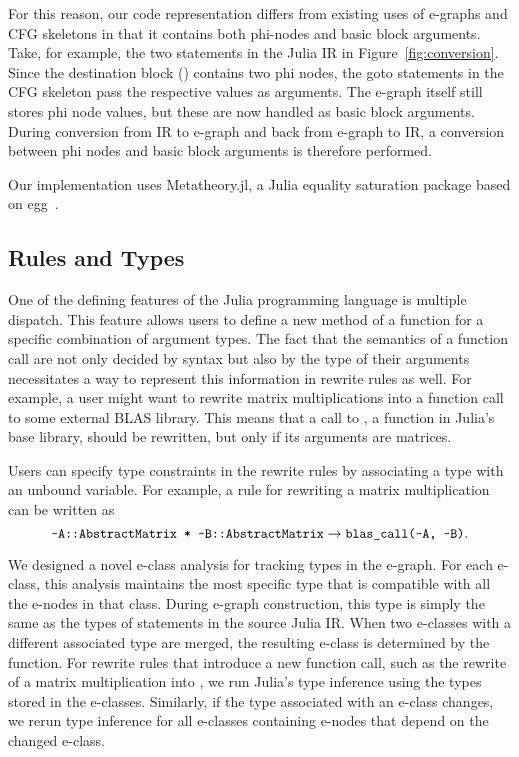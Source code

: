 For this reason, our code representation differs from existing uses of e-graphs and CFG skeletons in that it contains both phi-nodes and basic block arguments. 
Take, for example, the two  statements in the Julia IR in Figure~\ref{fig:conversion}.
Since the destination block () contains two phi nodes, the goto statements in the CFG skeleton pass the respective values as arguments.
The e-graph itself still stores phi node values, but these are now handled as basic block arguments.
During conversion from IR to e-graph and back from e-graph to IR, a conversion between phi nodes and basic block arguments is therefore performed. 

Our implementation uses Metatheory.jl, a Julia equality saturation package based on egg~\cite{cheliMetatheoryjlFastElegant2021,willseyEggFastExtensible2021}.

\subsection{Rules and Types}
\label{sec:types}
One of the defining features of the Julia programming language is multiple dispatch.
This feature allows users to define a new method of a function for a specific combination of argument types.
The fact that the semantics of a function call are not only decided by syntax but also by the type of their arguments necessitates a way to represent this information in rewrite rules as well.
For example, a user might want to rewrite matrix multiplications into a function call to some external BLAS library.
This means that a call to , a function in Julia's base library, should be rewritten, but only if its arguments are matrices.

Users can specify type constraints in the rewrite rules by associating a type with an unbound variable.
For example, a rule for rewriting a matrix multiplication can be written as
$$
\code{\char`\~A::AbstractMatrix * \char`\~B::AbstractMatrix} \rightarrow \code{blas\_call(\char`\~A, \char`\~B)}.
$$


We designed a novel e-class analysis for tracking types in the e-graph.
For each e-class, this analysis maintains the most specific type that is compatible with all the e-nodes in that class.
During e-graph construction, this type is simply the same as the types of statements in the source Julia IR.
When two e-classes with a different associated type are merged, the resulting e-class is determined by the  function.
For rewrite rules that introduce a new function call, such as the rewrite of a matrix multiplication into , we run Julia's type inference using the types stored in the e-classes.
Similarly, if the type associated with an e-class changes, we rerun type inference for all e-classes containing e-nodes that depend on the changed e-class.

